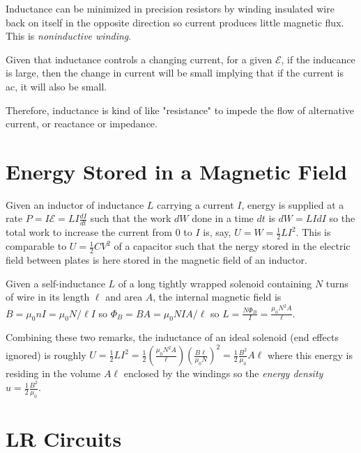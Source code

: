 \begin{definition}
    Inductance can be minimized in precision resistors by winding insulated wire back on itself in the opposite direction so current produces little magnetic flux. This is \emph{noninductive winding}.
\end{definition}
\begin{remark}
    Given that inductance controls a changing current, for a given $\mathscr{E}$, if the inducance is large, then the change in current will be small implying that if the current is ac, it will also be small. 

    Therefore, inductance is kind of like "resistance" to impede the flow of alternative current, or reactance or impedance.
\end{remark}

\section{Energy Stored in a Magnetic Field}

\begin{remark}
    Given an inductor of inductance $L$ carrying a current $I$, energy is supplied at a rate $P = I\mathscr{E} = LI\frac{dI}{dt}$ such that the work $dW$ done in a time $dt$ is $dW = LIdI$ so the total work to increase the current from 0 to $I$ is, say, $U = W = \frac{1}{2}LI^2$. This is comparable to $U = \frac{1}{2}CV^2$ of a capacitor such that the nergy stored in the electric field between plates is here stored in the magnetic field of an inductor.
\end{remark}
\begin{remark}
    Given a self-inductance $L$ of a long tightly wrapped solenoid containing $N$ turns of wire in its length $\ell$ and area $A$, the internal magnetic field is $B = \mu_0nI = \mu_0 N/\ell I$ so $\Phi_B = BA = \mu_0NIA/\ell$ so $L = \frac{N\Phi_B}{I} = \frac{\mu_0N^2A}{\ell}$.
\end{remark}
\begin{definition}
    Combining these two remarks, the inductance of an ideal solenoid (end effects ignored) is roughly $U = \frac{1}{2}LI^2 = \frac{1}{2}(\frac{\mu_0N^2A}{\ell})(\frac{B\ell}{\mu_0N})^2 = \frac{1}{2}\frac{B^2}{\mu_0}A\ell$ where this energy is residing in the volume $A\ell$ enclosed by the windings so the \emph{energy density} $u = \frac{1}{2}\frac{B^2}{\mu_0}$.
\end{definition}

\section{LR Circuits}

